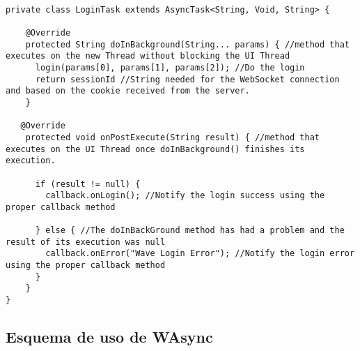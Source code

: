 	  \begin{lstlisting}[frame=single]
	  
private class LoginTask extends AsyncTask<String, Void, String> {
    
    @Override
    protected String doInBackground(String... params) { //method that executes on the new Thread without blocking the UI Thread
      login(params[0], params[1], params[2]); //Do the login 
      return sessionId //String needed for the WebSocket connection and based on the cookie received from the server.     
    }
   
   @Override
    protected void onPostExecute(String result) { //method that executes on the UI Thread once doInBackground() finishes its execution.    
      
      if (result != null) { 
        callback.onLogin(); //Notify the login success using the proper callback method
        
      } else { //The doInBackGround method has had a problem and the result of its execution was null
        callback.onError("Wave Login Error"); //Notify the login error using the proper callback method      
      }
    }
}    
	  \end{lstlisting} 
	  
\subsection{Esquema de uso de WAsync}\label{ssec:codewAsync}
	  	  
